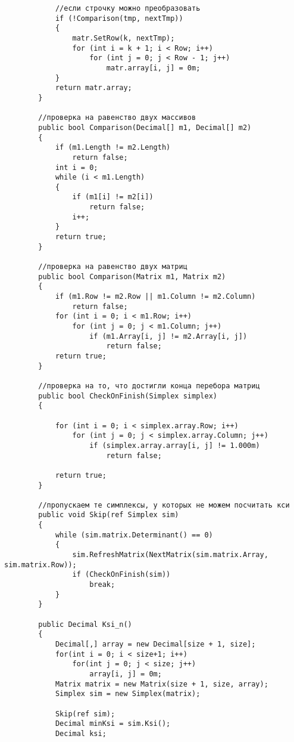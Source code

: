 \documentclass[12pt]{article} %
\begin{document}
\begin{verbatim}
            //если строчку можно преобразовать
            if (!Comparison(tmp, nextTmp))
            {
                matr.SetRow(k, nextTmp);
                for (int i = k + 1; i < Row; i++)
                    for (int j = 0; j < Row - 1; j++)
                        matr.array[i, j] = 0m;
            }
            return matr.array;
        }

        //проверка на равенство двух массивов
        public bool Comparison(Decimal[] m1, Decimal[] m2)
        {
            if (m1.Length != m2.Length)
                return false;
            int i = 0;
            while (i < m1.Length)
            {
                if (m1[i] != m2[i])
                    return false;
                i++;
            }
            return true;
        }
        
        //проверка на равенство двух матриц
        public bool Comparison(Matrix m1, Matrix m2)
        {
            if (m1.Row != m2.Row || m1.Column != m2.Column)
                return false;
            for (int i = 0; i < m1.Row; i++)
                for (int j = 0; j < m1.Column; j++)
                    if (m1.Array[i, j] != m2.Array[i, j])
                        return false;
            return true;
        }

        //проверка на то, что достигли конца перебора матриц
        public bool CheckOnFinish(Simplex simplex)
        {

            for (int i = 0; i < simplex.array.Row; i++)
                for (int j = 0; j < simplex.array.Column; j++)
                    if (simplex.array.array[i, j] != 1.000m)
                        return false;

            return true;
        }
        
        //пропускаем те симплексы, у которых не можем посчитать кси
        public void Skip(ref Simplex sim)
        {
            while (sim.matrix.Determinant() == 0)
            {
                sim.RefreshMatrix(NextMatrix(sim.matrix.Array, sim.matrix.Row));
                if (CheckOnFinish(sim))
                    break;
            }
        }

        public Decimal Ksi_n()
        {
            Decimal[,] array = new Decimal[size + 1, size];
            for(int i = 0; i < size+1; i++)
                for(int j = 0; j < size; j++)
                    array[i, j] = 0m;
            Matrix matrix = new Matrix(size + 1, size, array);
            Simplex sim = new Simplex(matrix);

            Skip(ref sim);
            Decimal minKsi = sim.Ksi();
            Decimal ksi;


\end{verbatim}
\end{document}
